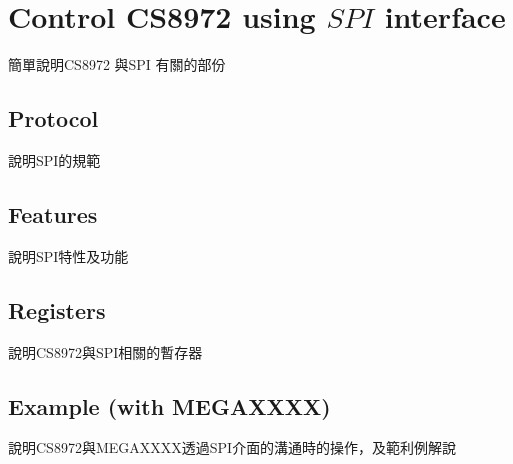 \chapter{Control CS8972 using {$SPI$} interface}
簡單說明CS8972 與SPI 有關的部份
	\section{Protocol}
	說明SPI的規範

	\section{Features}
	說明SPI特性及功能

	\section{Registers}
	說明CS8972與SPI相關的暫存器
	
	\section{Example (with MEGAXXXX)}
	說明CS8972與MEGAXXXX透過SPI介面的溝通時的操作，及範利例解說